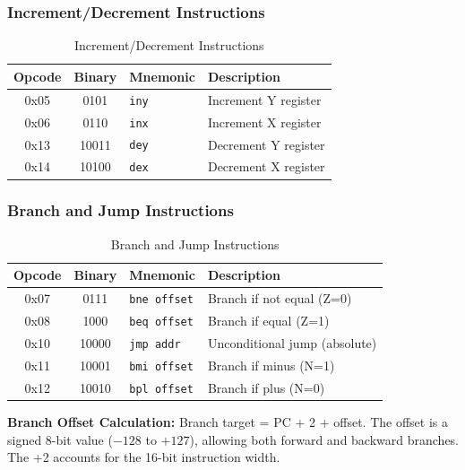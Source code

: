 \documentclass[11pt,a4paper]{article}
\begin{document}
\subsubsection{Increment/Decrement Instructions}

\begin{table}[H]
\centering
\caption{Increment/Decrement Instructions}
\begin{tabular}{@{}cclp{6cm}@{}}
\toprule
\textbf{Opcode} & \textbf{Binary} & \textbf{Mnemonic} & \textbf{Description} \\
\midrule
0x05 & 0101 & \texttt{iny} & Increment Y register \\
0x06 & 0110 & \texttt{inx} & Increment X register \\
0x13 & 10011 & \texttt{dey} & Decrement Y register \\
0x14 & 10100 & \texttt{dex} & Decrement X register \\
\bottomrule
\end{tabular}
\end{table}

\subsubsection{Branch and Jump Instructions}

\begin{table}[H]
\centering
\caption{Branch and Jump Instructions}
\begin{tabular}{@{}cclp{6cm}@{}}
\toprule
\textbf{Opcode} & \textbf{Binary} & \textbf{Mnemonic} & \textbf{Description} \\
\midrule
0x07 & 0111 & \texttt{bne offset} & Branch if not equal (Z=0) \\
0x08 & 1000 & \texttt{beq offset} & Branch if equal (Z=1) \\
0x10 & 10000 & \texttt{jmp addr} & Unconditional jump (absolute) \\
0x11 & 10001 & \texttt{bmi offset} & Branch if minus (N=1) \\
0x12 & 10010 & \texttt{bpl offset} & Branch if plus (N=0) \\
\bottomrule
\end{tabular}
\end{table}

\textbf{Branch Offset Calculation:} Branch target = PC + 2 + offset. The offset is a signed 8-bit value ($-128$ to $+127$), allowing both forward and backward branches. The +2 accounts for the 16-bit instruction width.
\end{document}
